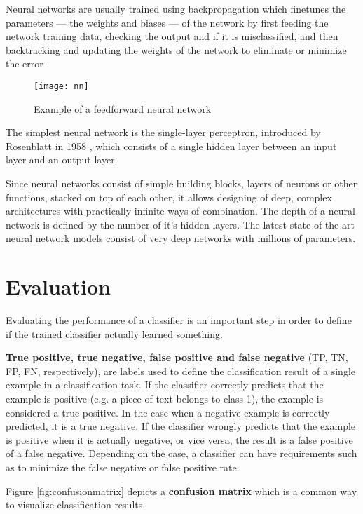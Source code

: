 Neural networks are usually trained using backpropagation which finetunes the parameters --- the weights and biases --- of the network by first feeding the network training data, checking the output and if it is misclassified, and then backtracking and updating the weights of the network to eliminate or minimize the error \cite{sebastiani2002}.

\begin{figure}[t]
\texttt{[image: nn]}
\centering
\caption{Example of a feedforward neural network}
\label{fig:nn}
\end{figure}

The simplest neural network is the single-layer perceptron, introduced by Rosenblatt in 1958 \cite{rosenblatt1958}, which consists of a single hidden layer between an input layer and an output layer.

Since neural networks consist of simple building blocks, layers of neurons or other functions, stacked on top of each other, it allows designing of deep, complex architectures with practically infinite ways of combination.
The depth of a neural network is defined by the number of it's hidden layers.
The latest state-of-the-art neural network models consist of very deep networks with millions of parameters.

\section{Evaluation} \label{Evaluation}
Evaluating the performance of a classifier is an important step in order to define if the trained classifier actually learned something.

\textbf{True positive, true negative, false positive and false negative} (TP, TN, FP, FN, respectively), are labels used to define the classification result of a single example in a classification task.
If the classifier correctly predicts that the example is positive (e.g. a piece of text belongs to class 1), the example is considered a true positive.
In the case when a negative example is correctly predicted, it is a true negative.
If the classifier wrongly predicts that the example is positive when it is actually negative, or vice versa, the result is a false positive of a false negative.
Depending on the case, a classifier can have requirements such as to minimize the false negative or false positive rate.

Figure \ref{fig:confusionmatrix} depicts a \textbf{confusion matrix} which is a common way to visualize classification results.

